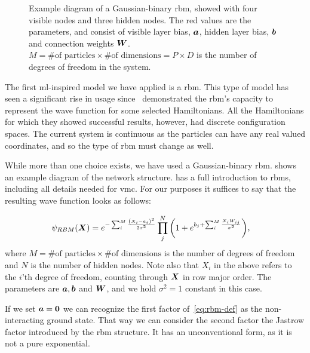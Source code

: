 \documentclass[Thesis.tex]{subfiles}
\begin{document}
\begin{figure}[h]
  \centering
  
  \caption[Illustration of a \acrfull{rbm}]{Example diagram of a Gaussian-binary \acrlong{rbm}, showed with four visible nodes
    and three hidden nodes. The red values are the parameters, and consist of
    visible layer bias, $\bm{a}$, hidden layer bias, $\bm{b}$ and connection
    weights $\bm{W}$. $M = \text{\# of particles}\times \text{\# of
      dimensions}=P\times D$ is the number of degrees of freedom in the system.}
  \label{fig:rbm-diagram-example}
\end{figure}


The first \gls{ml}-inspired model we have applied is a \acrfull{rbm}.
This type of model has seen a significant rise in usage
since~\textcite{Carleo602} demonstrated the \gls{rbm}'s capacity to
represent the wave function for some selected Hamiltonians. All the
Hamiltonians for which they showed successful results, however, had discrete
configuration spaces. The current system is continuous as the particles can have
any real valued coordinates, and so the type of \gls{rbm} must change as well.

While more than one choice exists, we have used a Gaussian-binary \gls{rbm}\@.
 shows an example diagram of the network
structure. \textcite{Flugsrud-2018} has a full introduction to \glspl{rbm}, including
all details needed for \gls{vmc}\@. For our purposes it suffices to say that the
resulting wave function looks as follows:

\begin{align}
  \label{eq:rbm-def}
  \psi_{RBM}(\bm{X}) &=
        e^{-\sum_i^{M} \frac{\qty(X_i-a_i)^2}{2\sigma^2}}
        \prod_j^N \qty(1 + e^{b_j+\sum_i^M \frac{X_iW_{ij}}{\sigma^2}}),
\end{align}
where $M = \text{\# of particles}\times \text{\# of dimensions}$ is the number of degrees of freedom and $N$ is the number
of hidden nodes. Note also that $X_i$ in the above refers to the $i$'th degree
of freedom, counting through $\bm{X}$ in row major order. The parameters are
$\bm{a}, \bm{b}$ and $\bm{W}$, and we hold $\sigma^2=1$ constant in this case.

If we set $\bm{a} = \bm{0}$ we can recognize the first factor of~\cref{eq:rbm-def}
as the non-interacting ground state. That way we can consider the second factor
the Jastrow factor introduced by the \gls{rbm} structure. It has an unconventional
form, as it is not a pure exponential.
\end{document}
